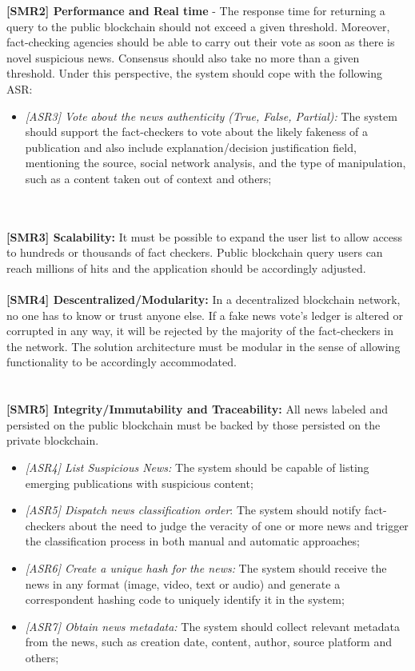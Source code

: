 \noindent\textbf{[SMR2] Performance and Real time} - The response time for returning a query to the public blockchain should not exceed a given threshold. Moreover, fact-checking agencies should be able to carry out their vote as soon as there is novel suspicious news. Consensus should also take no more than a given threshold. Under this perspective, the system should cope with the following ASR:
\begin{itemize}
            \item\textit{[ASR3] Vote about the news authenticity (True, False, Partial):} The system should support the fact-checkers to vote about the likely fakeness of a publication and also include explanation/decision justification field, mentioning the source, social network analysis, and the type of manipulation, such as a content taken out of context and others;

\end{itemize}
\\\\
\noindent\textbf{[SMR3] Scalability:} It must be possible to expand the user list to allow access to hundreds or thousands of fact checkers. Public blockchain query users can reach millions of hits and the application should be accordingly adjusted.	
\\\\
\noindent\textbf{[SMR4] Descentralized/Modularity:} In a decentralized blockchain network, no one has to know or trust anyone else. %
If a fake news vote's ledger is altered or corrupted in any way, it will be rejected by the majority of the fact-checkers in the network. The solution architecture must be modular in the sense of allowing functionality to be accordingly accommodated. \\ %
\\\\
\noindent\textbf{[SMR5] Integrity/Immutability and Traceability:} All news labeled and persisted on the public blockchain must be backed by those persisted on the private blockchain.
\begin{itemize}
            \item\textit{[ASR4] List Suspicious News:} The system should be capable of listing emerging publications with suspicious content;
            \item\textit{[ASR5] Dispatch news classification order}: The system should notify fact-checkers about the need to judge the veracity of one or more news and trigger the classification process in both manual and automatic approaches;
            \item\textit{[ASR6] Create a unique hash for the news:} The system should receive the news in any format (image, video, text or audio) and generate a correspondent hashing code to uniquely identify it in the system; 
            \item\textit{[ASR7] Obtain news metadata:} The system should collect relevant metadata from the news, such as creation date, content, author, source platform and others;
\end{itemize}
